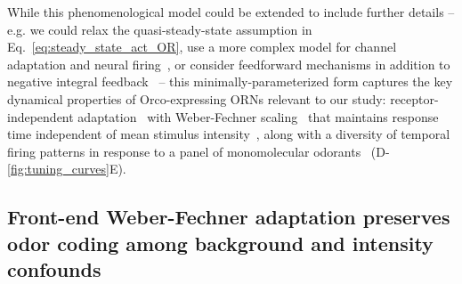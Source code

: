 \documentclass[9pt,lineno]{elife}
\begin{document}
While this phenomenological model could be extended to include further details -- e.g. we could relax the quasi-steady-state assumption in Eq.~\ref{eq:steady_state_act_OR}, use a more complex model for channel adaptation and neural firing~\citep{srinivas_elife}, or consider feedforward mechanisms in addition to negative integral feedback~\citep{louis_feedforward} -- this minimally-parameterized form captures the key dynamical properties of Orco-expressing ORNs relevant to our study: receptor-independent adaptation~\citep{nagel_wilson_biophysical} with Weber-Fechner scaling~\citep{srinivas_elife, cafaro_WL,cao_WL} that maintains response time independent of mean stimulus intensity~\citep{martelli,srinivas_elife}, along with a diversity of temporal firing patterns in response to a panel of monomolecular odorants~\citep{hallem_carlson, montague2011similar, stopfer_nat_neuro, stopfer_temporal_channel, stopfer_temporal_model} (D-\ref{fig:tuning_curves}E).









\subsection{Front-end Weber-Fechner adaptation preserves odor coding among background and intensity confounds}
\end{document}
